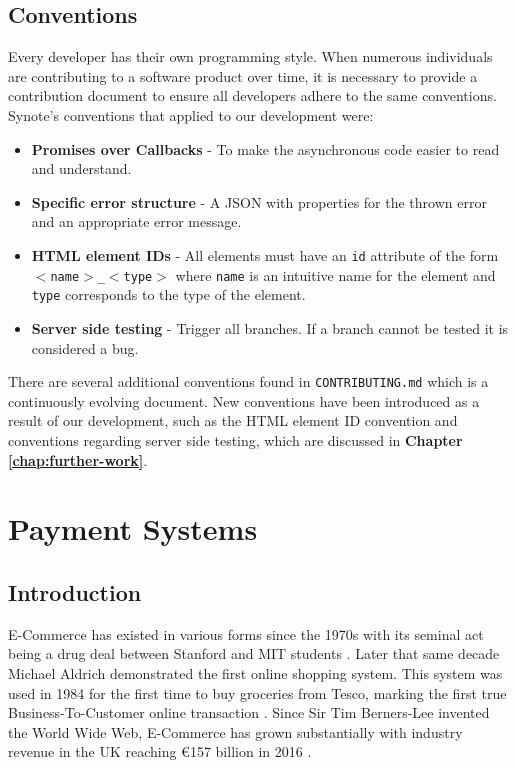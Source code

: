 \subsection{Conventions}
\label{subsec:conventions}

Every developer has their own programming style. When numerous individuals are contributing to a software product over time, it is necessary to provide a contribution document to ensure all developers adhere to the same conventions. Synote's conventions that applied to our development were:

\begin{itemize}
    \item \textbf{Promises over Callbacks} - To make the asynchronous code easier to read and understand.
    \item \textbf{Specific error structure} - A JSON with properties for the thrown error and an appropriate error message.
    \item \textbf{HTML element IDs} - All elements must have an \texttt{id} attribute of the form  \texttt{$<$name$>$\_$<$type$>$} where \texttt{name} is an intuitive name for the element and \texttt{type} corresponds to the type of the element.
    \item \textbf{Server side testing} - Trigger all branches. If a branch cannot be tested it is considered a bug.
\end{itemize}

There are several additional conventions found in \texttt{CONTRIBUTING.md} which is a continuously evolving document. New conventions have been introduced as a result of our development, such as the HTML element ID convention and conventions regarding server side testing, which are discussed in \textbf{Chapter \ref{chap:further-work}}.

\section{Payment Systems}
\label{sec:payment-systems}


\subsection{Introduction}
\label{sec:payment-intro}

E-Commerce has existed in various forms since the 1970s with its seminal act being a drug deal between Stanford and MIT students \cite{power-mike-online-highs}. Later that same decade Michael Aldrich demonstrated the first online shopping system. This system was used in 1984 for the first time to buy groceries from Tesco, marking the first true Business-To-Customer online transaction \cite{winterman-kelly-online-shopper}. Since Sir Tim Berners-Lee invented the World Wide Web, E-Commerce has grown substantially with industry revenue in the UK reaching \euro{157 billion} in 2016 \cite{khaksar-2016}.\\

